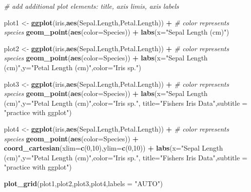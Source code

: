 \documentclass[
]{article}
\newenvironment{Shaded}{\begin{snugshade}}{\end{snugshade}}
\newcommand{\AttributeTok}[1]{\textcolor[rgb]{0.13,0.29,0.53}{#1}}
\newcommand{\CommentTok}[1]{\textcolor[rgb]{0.56,0.35,0.01}{\textit{#1}}}
\newcommand{\DecValTok}[1]{\textcolor[rgb]{0.00,0.00,0.81}{#1}}
\newcommand{\FunctionTok}[1]{\textcolor[rgb]{0.13,0.29,0.53}{\textbf{#1}}}
\newcommand{\NormalTok}[1]{#1}
\newcommand{\OtherTok}[1]{\textcolor[rgb]{0.56,0.35,0.01}{#1}}
\newcommand{\SpecialCharTok}[1]{\textcolor[rgb]{0.81,0.36,0.00}{\textbf{#1}}}
\newcommand{\StringTok}[1]{\textcolor[rgb]{0.31,0.60,0.02}{#1}}
\begin{document}
\begin{Shaded}
\begin{Highlighting}[]
\CommentTok{\# add additional plot elements: title, axis limis, axis labels }

\NormalTok{plot1 }\OtherTok{\textless{}{-}} \FunctionTok{ggplot}\NormalTok{(iris,}\FunctionTok{aes}\NormalTok{(Sepal.Length,Petal.Length)) }\SpecialCharTok{+}    \CommentTok{\# color represents species}
  \FunctionTok{geom\_point}\NormalTok{(}\FunctionTok{aes}\NormalTok{(}\AttributeTok{color=}\NormalTok{Species)) }\SpecialCharTok{+} 
  \FunctionTok{labs}\NormalTok{(}\AttributeTok{x=}\StringTok{"Sepal Length (cm)"}\NormalTok{)}

\NormalTok{plot2 }\OtherTok{\textless{}{-}} \FunctionTok{ggplot}\NormalTok{(iris,}\FunctionTok{aes}\NormalTok{(Sepal.Length,Petal.Length)) }\SpecialCharTok{+}    \CommentTok{\# color represents species}
  \FunctionTok{geom\_point}\NormalTok{(}\FunctionTok{aes}\NormalTok{(}\AttributeTok{color=}\NormalTok{Species)) }\SpecialCharTok{+} 
  \FunctionTok{labs}\NormalTok{(}\AttributeTok{x=}\StringTok{"Sepal Length (cm)"}\NormalTok{,}\AttributeTok{y=}\StringTok{"Petal Length (cm)"}\NormalTok{,}\AttributeTok{color=}\StringTok{"Iris sp."}\NormalTok{)}

\NormalTok{plot3 }\OtherTok{\textless{}{-}} \FunctionTok{ggplot}\NormalTok{(iris,}\FunctionTok{aes}\NormalTok{(Sepal.Length,Petal.Length)) }\SpecialCharTok{+}    \CommentTok{\# color represents species}
  \FunctionTok{geom\_point}\NormalTok{(}\FunctionTok{aes}\NormalTok{(}\AttributeTok{color=}\NormalTok{Species)) }\SpecialCharTok{+} 
  \FunctionTok{labs}\NormalTok{(}\AttributeTok{x=}\StringTok{"Sepal Length (cm)"}\NormalTok{,}\AttributeTok{y=}\StringTok{"Petal Length (cm)"}\NormalTok{,}\AttributeTok{color=}\StringTok{"Iris sp."}\NormalTok{,}
       \AttributeTok{title=}\StringTok{"Fisher\textquotesingle{}s Iris Data"}\NormalTok{,}\AttributeTok{subtitle =} \StringTok{"practice with ggplot"}\NormalTok{)}

\NormalTok{plot4 }\OtherTok{\textless{}{-}} \FunctionTok{ggplot}\NormalTok{(iris,}\FunctionTok{aes}\NormalTok{(Sepal.Length,Petal.Length)) }\SpecialCharTok{+}    \CommentTok{\# color represents species}
  \FunctionTok{geom\_point}\NormalTok{(}\FunctionTok{aes}\NormalTok{(}\AttributeTok{color=}\NormalTok{Species)) }\SpecialCharTok{+} 
  \FunctionTok{coord\_cartesian}\NormalTok{(}\AttributeTok{xlim=}\FunctionTok{c}\NormalTok{(}\DecValTok{0}\NormalTok{,}\DecValTok{10}\NormalTok{),}\AttributeTok{ylim=}\FunctionTok{c}\NormalTok{(}\DecValTok{0}\NormalTok{,}\DecValTok{10}\NormalTok{)) }\SpecialCharTok{+}
  \FunctionTok{labs}\NormalTok{(}\AttributeTok{x=}\StringTok{"Sepal Length (cm)"}\NormalTok{,}\AttributeTok{y=}\StringTok{"Petal Length (cm)"}\NormalTok{,}\AttributeTok{color=}\StringTok{"Iris sp."}\NormalTok{,}
       \AttributeTok{title=}\StringTok{"Fisher\textquotesingle{}s Iris Data"}\NormalTok{,}\AttributeTok{subtitle =} \StringTok{"practice with ggplot"}\NormalTok{)}

\FunctionTok{plot\_grid}\NormalTok{(plot1,plot2,plot3,plot4,}\AttributeTok{labels =} \StringTok{"AUTO"}\NormalTok{)}
\end{Highlighting}
\end{Shaded}
\end{document}
